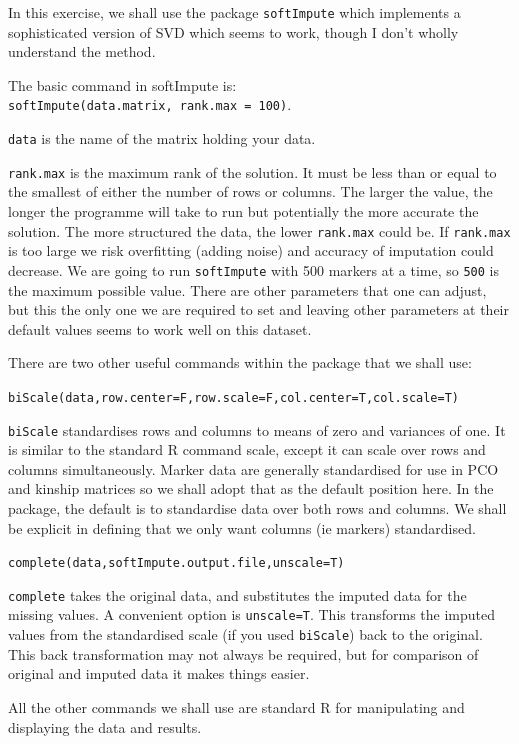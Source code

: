 \documentclass[
]{book}
\begin{document}
In this exercise, we shall use the package \texttt{softImpute} which implements a sophisticated version of SVD which seems to work, though I don't wholly understand the method.

The basic command in softImpute is: \texttt{softImpute(data.matrix,\ rank.max\ =\ 100)}.

\texttt{data} is the name of the matrix holding your data.

\texttt{rank.max} is the maximum rank of the solution. It must be less than or equal to the smallest of either the number of rows or columns. The larger the value, the longer the programme will take to run but potentially the more accurate the solution. The more structured the data, the lower \texttt{rank.max} could be. If \texttt{rank.max} is too large we risk overfitting (adding noise) and accuracy of imputation could decrease. We are going to run \texttt{softImpute} with 500 markers at a time, so \texttt{500} is the maximum possible value. There are other parameters that one can adjust, but this the only one we are required to set and leaving other parameters at their default values seems to work well on this dataset.

There are two other useful commands within the package that we shall use:

\texttt{biScale(data,row.center=F,row.scale=F,col.center=T,col.scale=T)}

\texttt{biScale} standardises rows and columns to means of zero and variances of one. It is similar to the standard R command scale, except it can scale over rows and columns simultaneously. Marker data are generally standardised for use in PCO and kinship matrices so we shall adopt that as the default position here. In the package, the default is to standardise data over both rows and columns. We shall be explicit in defining that we only want columns (ie markers) standardised.

\texttt{complete(data,softImpute.output.file,unscale=T)}

\texttt{complete} takes the original data, and substitutes the imputed data for the missing values. A convenient option is \texttt{unscale=T}. This transforms the imputed values from the standardised scale (if you used \texttt{biScale}) back to the original. This back transformation may not always be required, but for comparison of original and imputed data it makes things easier.

All the other commands we shall use are standard R for manipulating and displaying the data and results.
\end{document}
